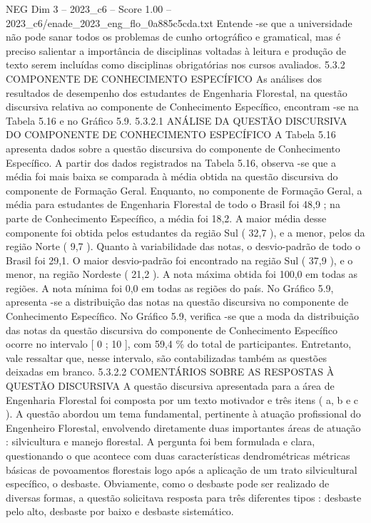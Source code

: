 \begin{textsample}{NEG Dim 3 – 2023\_c6 – Score 1.00 – 2023\_c6/enade\_2023\_eng\_flo\_0a885c5cda.txt}
Entende -se que a universidade não pode sanar todos os problemas de cunho ortográfico e gramatical, mas é preciso salientar a importância de disciplinas voltadas à leitura e produção de texto serem incluídas como disciplinas obrigatórias nos cursos avaliados. 5.3.2 COMPONENTE DE CONHECIMENTO ESPECÍFICO As análises dos resultados de desempenho dos estudantes de Engenharia Florestal, na questão discursiva relativa ao componente de Conhecimento Específico, encontram -se na Tabela 5.16 e no Gráfico 5.9. 5.3.2.1 ANÁLISE DA QUESTÃO DISCURSIVA DO COMPONENTE DE CONHECIMENTO ESPECÍFICO A Tabela 5.16 apresenta dados sobre a questão discursiva do componente de Conhecimento Específico.
A partir dos dados registrados na Tabela 5.16, observa -se que a média foi mais baixa se comparada à média obtida na questão discursiva do componente de Formação Geral.
Enquanto, no componente de Formação Geral, a média para estudantes de Engenharia Florestal de todo o Brasil foi 48,9 ; na parte de Conhecimento Específico, a média foi 18,2.
A maior média desse componente foi obtida pelos estudantes da região Sul ( 32,7 ), e a menor, pelos da região Norte ( 9,7 ).
Quanto à variabilidade das notas, o desvio-padrão de todo o Brasil foi 29,1.
O maior desvio-padrão foi encontrado na região Sul ( 37,9 ), e o menor, na região Nordeste ( 21,2 ).
A nota máxima obtida foi 100,0 em todas as regiões.
A nota mínima foi 0,0 em todas as regiões do país.
No Gráfico 5.9, apresenta -se a distribuição das notas na questão discursiva no componente de Conhecimento Específico.
No Gráfico 5.9, verifica -se que a moda da distribuição das notas da questão discursiva do componente de Conhecimento Específico ocorre no intervalo [ 0 ; 10 ], com 59,4 \% do total de participantes.
Entretanto, vale ressaltar que, nesse intervalo, são contabilizadas também as questões deixadas em branco. 5.3.2.2 COMENTÁRIOS SOBRE AS RESPOSTAS À QUESTÃO DISCURSIVA A questão discursiva apresentada para a área de Engenharia Florestal foi composta por um texto motivador e três itens ( a, b e c ).
A questão abordou um tema fundamental, pertinente à atuação profissional do Engenheiro Florestal, envolvendo diretamente duas importantes áreas de atuação : silvicultura e manejo florestal.
A pergunta foi bem formulada e clara, questionando o que acontece com duas características dendrométricas métricas básicas de povoamentos florestais logo após a aplicação de um trato silvicultural específico, o desbaste.
Obviamente, como o desbaste pode ser realizado de diversas formas, a questão solicitava resposta para três diferentes tipos : desbaste pelo alto, desbaste por baixo e desbaste sistemático.

\end{textsample}
